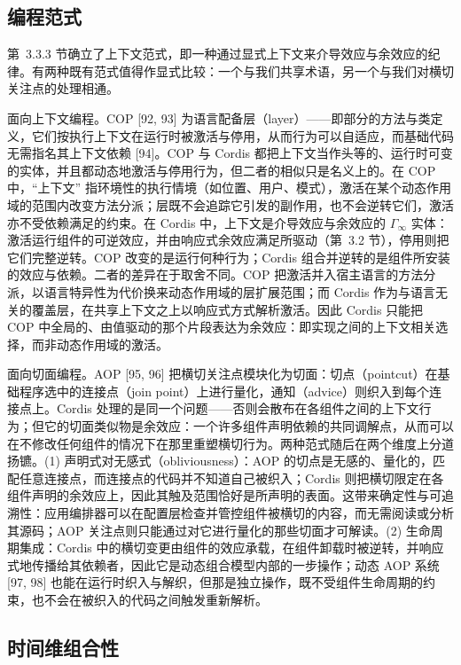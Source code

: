 \documentclass[
  10
]{article}
\begin{document}
\subsection{编程范式} \label{programming-paradigms}

第~3.3.3 节确立了上下文范式，即一种通过显式上下文来介导效应与余效应的纪律。有两种既有范式值得作显式比较：一个与我们共享术语，另一个与我们对横切关注点的处理相通。

面向上下文编程。COP {[}92, 93{]} 为语言配备层（layer）——即部分的方法与类定义，它们按执行上下文在运行时被激活与停用，从而行为可以自适应，而基础代码无需指名其上下文依赖 {[}94{]}。COP 与 Cordis 都把上下文当作头等的、运行时可变的实体，并且都动态地激活与停用行为，但二者的相似只是名义上的。在 COP 中，``上下文'' 指环境性的执行情境（如位置、用户、模式），激活在某个动态作用域的范围内改变方法分派；层既不会追踪它引发的副作用，也不会逆转它们，激活亦不受依赖满足的约束。在 Cordis 中，上下文是介导效应与余效应的 \(\Gamma _ { \infty }\) 实体：激活运行组件的可逆效应，并由响应式余效应满足所驱动（第~3.2 节），停用则把它们完整逆转。COP 改变的是运行何种行为；Cordis 组合并逆转的是组件所安装的效应与依赖。二者的差异在于取舍不同。COP 把激活并入宿主语言的方法分派，以语言特异性为代价换来动态作用域的层扩展范围；而 Cordis 作为与语言无关的覆盖层，在共享上下文之上以响应式方式解析激活。因此 Cordis 只能把 COP 中全局的、由值驱动的那个片段表达为余效应：即实现之间的上下文相关选择，而非动态作用域的激活。

面向切面编程。AOP {[}95, 96{]} 把横切关注点模块化为切面：切点（pointcut）在基础程序选中的连接点（join point）上进行量化，通知（advice）则织入到每个连接点上。Cordis 处理的是同一个问题——否则会散布在各组件之间的上下文行为；但它的切面类似物是余效应：一个许多组件声明依赖的共同调解点，从而可以在不修改任何组件的情况下在那里重塑横切行为。两种范式随后在两个维度上分道扬镳。(1) 声明式对无感式（obliviousness）：AOP 的切点是无感的、量化的，匹配任意连接点，而连接点的代码并不知道自己被织入；Cordis 则把横切限定在各组件声明的余效应上，因此其触及范围恰好是所声明的表面。这带来确定性与可追溯性：应用编排器可以在配置层检查并管控组件被横切的内容，而无需阅读或分析其源码；AOP 关注点则只能通过对它进行量化的那些切面才可解读。(2) 生命周期集成：Cordis 中的横切变更由组件的效应承载，在组件卸载时被逆转，并响应式地传播给其依赖者，因此它是动态组合模型内部的一步操作；动态 AOP 系统 {[}97, 98{]} 也能在运行时织入与解织，但那是独立操作，既不受组件生命周期的约束，也不会在被织入的代码之间触发重新解析。

\subsection{时间维组合性} \label{temporal-composability-1}
\end{document}
